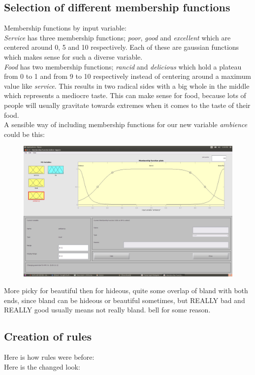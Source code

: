 \documentclass[a4paper, 11pt]{article}
\begin{document}
\subsection{Selection of different membership functions}
Membership functions by input variable:\\
\textit{Service} has three membership functions; \textit{poor}, \textit{good} and \textit{excellent} which are centered around 0, 5 and 10 respectively. Each of these are gaussian functions which makes sense for such a diverse variable.\\
\textit{Food} has two membership functions; \textit{rancid} and \textit{delicious} which hold a plateau from 0 to 1 and from 9 to 10 respectively instead of centering around a maximum value like \textit{service}. This results in two radical sides with a big whole in the middle which represents a mediocre taste. This can make sense for food, because lots of people will usually gravitate towards extremes when it comes to the taste of their food.\\
A sensible way of including membership functions for our new variable \textit{ambience} could be this:

\begin{figure}[ht]
\includegraphics[scale=0.2]{ambience-mf.jpg}
\end{figure}

More picky for beautiful then for hideous, quite some overlap of bland with both ends, since bland can be hideous or beautiful sometimes, but REALLY bad and REALLY good usually means not really bland. bell for some reason.

\newpage
\subsection{Creation of rules}
Here is how rules were before:\\
Here is the changed look:
\end{document}
